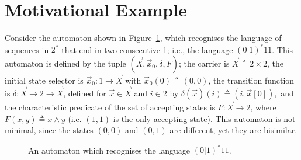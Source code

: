 \section{Motivational Example}
\label{sec:Latent:Motivation}
Consider the automaton shown in Figure~\ref{fig:ExampleLatent}, which recognises the language of sequences in $2^*$ that end in two consecutive 1; i.e., the language $(0|1)^*11$. 
This automaton is defined by the tuple $(\vec{X},\vec{x}_0,\delta,F)$; the carrier is $\vec{X}\triangleq2\times2$, the initial state selector is $\vec{x}_0\colon1\rightarrow \vec{X}$ with $\vec{x}_0(0)\triangleq(0,0)$, the transition function is $\delta\colon \vec{X}\rightarrow 2\rightarrow\vec{X}$, defined for $\vec{x}\in \vec{X}$ and $i \in 2$ by $\delta(\vec{x})(i)\triangleq(i,\vec{x}[0]),$ and the characteristic predicate of the set of accepting states is $F\colon\vec{X}\rightarrow 2$, where $F(x,y)\triangleq x \land y$
(i.e. $(1,1)$ is the only accepting state). This automaton is not minimal, since the states $(0,0)$ and $(0,1)$ are different, yet they are bisimilar.

\begin{figure}[t]
    \centering
    \caption{An automaton which recognises the language $(0|1)^*11$.}
    \label{fig:ExampleLatent}
\end{figure}

